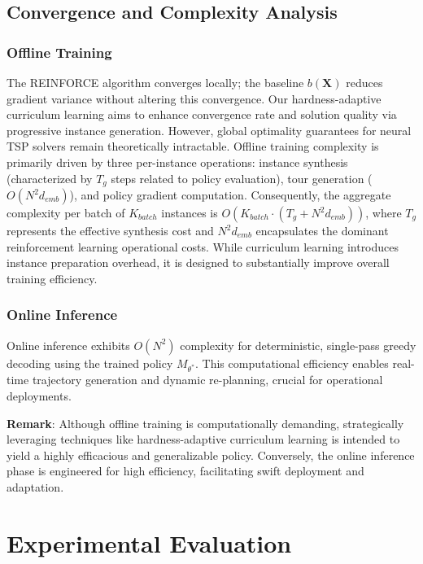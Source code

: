\documentclass[10pt,conference,letterpaper]{IEEEtran}
\begin{document}
\subsection{Convergence and Complexity Analysis}
\subsubsection{Offline Training}
The REINFORCE algorithm converges locally; the baseline $b(\mathbf{X})$ reduces gradient variance without altering this convergence. Our hardness-adaptive curriculum learning aims to enhance convergence rate and solution quality via progressive instance generation. However, global optimality guarantees for neural TSP solvers remain theoretically intractable. Offline training complexity is primarily driven by three per-instance operations: instance synthesis (characterized by $T_g$ steps related to policy evaluation), tour generation ($O(N^2 d_{emb})$), and policy gradient computation. Consequently, the aggregate complexity per batch of $K_{batch}$ instances is $O(K_{batch} \cdot (T_g + N^2 d_{emb}))$, where $T_g$ represents the effective synthesis cost and $N^2 d_{emb}$ encapsulates the dominant reinforcement learning operational costs. While curriculum learning introduces instance preparation overhead, it is designed to substantially improve overall training efficiency.

\subsubsection{Online Inference}
Online inference exhibits $O(N^2)$ complexity for deterministic, single-pass greedy decoding using the trained policy $M_{\theta^*}$. This computational efficiency enables real-time trajectory generation and dynamic re-planning, crucial for operational deployments.

\textbf{Remark}: Although offline training is computationally demanding, strategically leveraging techniques like hardness-adaptive curriculum learning is intended to yield a highly efficacious and generalizable policy. Conversely, the online inference phase is engineered for high efficiency, facilitating swift deployment and adaptation.



\section{Experimental Evaluation}
\label{sec:experiments}
\end{document}
